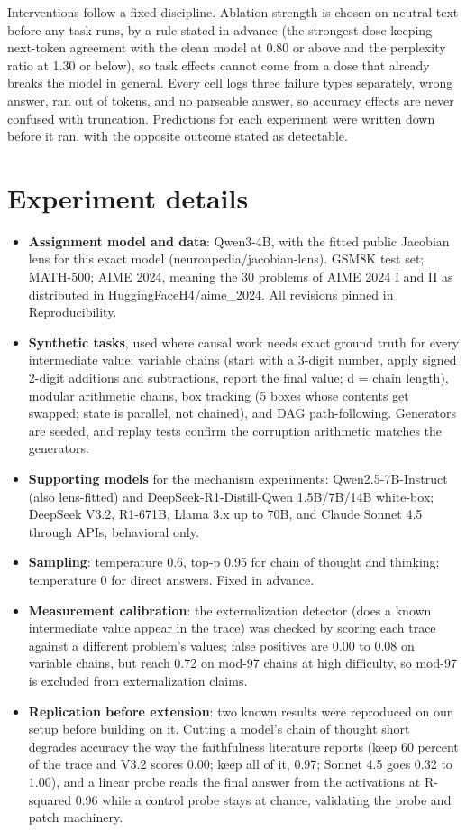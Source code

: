 Interventions follow a fixed discipline. Ablation strength is chosen on
neutral text before any task runs, by a rule stated in advance (the
strongest dose keeping next-token agreement with the clean model at 0.80
or above and the perplexity ratio at 1.30 or below), so task effects
cannot come from a dose that already breaks the model in general. Every
cell logs three failure types separately, wrong answer, ran out of
tokens, and no parseable answer, so accuracy effects are never confused
with truncation. Predictions for each experiment were written down
before it ran, with the opposite outcome stated as detectable.

\section{Experiment details}\label{experiment-details}

\begin{itemize}
\tightlist
\item
  \textbf{Assignment model and data}: Qwen3-4B, with the fitted public
  Jacobian lens for this exact model (neuronpedia/jacobian-lens). GSM8K
  test set; MATH-500; AIME 2024, meaning the 30 problems of AIME 2024 I
  and II as distributed in HuggingFaceH4/aime\_2024. All revisions
  pinned in Reproducibility.
\item
  \textbf{Synthetic tasks}, used where causal work needs exact ground
  truth for every intermediate value: variable chains (start with a
  3-digit number, apply signed 2-digit additions and subtractions,
  report the final value; d = chain length), modular arithmetic chains,
  box tracking (5 boxes whose contents get swapped; state is parallel,
  not chained), and DAG path-following. Generators are seeded, and
  replay tests confirm the corruption arithmetic matches the generators.
\item
  \textbf{Supporting models} for the mechanism experiments:
  Qwen2.5-7B-Instruct (also lens-fitted) and DeepSeek-R1-Distill-Qwen
  1.5B/7B/14B white-box; DeepSeek V3.2, R1-671B, Llama 3.x up to 70B,
  and Claude Sonnet 4.5 through APIs, behavioral only.
\item
  \textbf{Sampling}: temperature 0.6, top-p 0.95 for chain of thought
  and thinking; temperature 0 for direct answers. Fixed in advance.
\item
  \textbf{Measurement calibration}: the externalization detector (does a
  known intermediate value appear in the trace) was checked by scoring
  each trace against a different problem's values; false positives are
  0.00 to 0.08 on variable chains, but reach 0.72 on mod-97 chains at
  high difficulty, so mod-97 is excluded from externalization claims.
\item
  \textbf{Replication before extension}: two known results were
  reproduced on our setup before building on it. Cutting a model's chain
  of thought short degrades accuracy the way the faithfulness literature
  reports (keep 60 percent of the trace and V3.2 scores 0.00; keep all
  of it, 0.97; Sonnet 4.5 goes 0.32 to 1.00), and a linear probe reads
  the final answer from the activations at R-squared 0.96 while a
  control probe stays at chance, validating the probe and patch
  machinery.
\end{itemize}

